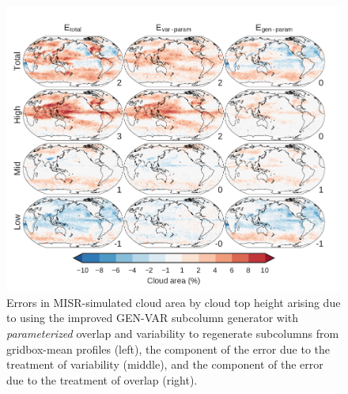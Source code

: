 \begin{figure}[htbp]
\centering
\includegraphics{graphics/subgrid2_cldmisr_maps_gen-var-param_diff.pdf}
\caption{\label{fig:cldmisrMapsParamDiff}Errors in MISR-simulated cloud
area by cloud top height arising due to using the improved GEN-VAR
subcolumn generator with \emph{parameterized} overlap and variability to
regenerate subcolumns from gridbox-mean profiles (left), the component
of the error due to the treatment of variability (middle), and the
component of the error due to the treatment of overlap
(right).}\label{fig:cldmisrMapsParamDiff}
\end{figure}

